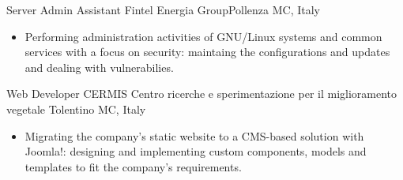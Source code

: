 %
  {Server Admin Assistant}
  {Fintel Energia Group}{Pollenza MC, Italy}
  {}{
\begin{itemize}
	\item Performing administration activities of GNU/Linux systems and common services with a focus on
    security: maintaing the configurations and updates and dealing with vulnerabilies.
\end{itemize}
}
%
  {Web Developer}
  {CERMIS Centro ricerche e sperimentazione per il miglioramento vegetale}
  {Tolentino MC, Italy}
  {}{
\begin{itemize}
\item Migrating the company's static website to a CMS-based solution with Joomla!: designing and
  implementing custom components, models and templates to fit the company's requirements.
\end{itemize}
}

